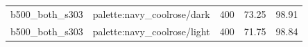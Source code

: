 \begin{longtable}{l>{\raggedright\arraybackslash}p{.42\linewidth}rrr}
b500\_\allowbreak{}both\_\allowbreak{}s303 & %
palette:navy\_\allowbreak{}coolrose/dark & %
400 & %
73.25 & %
98.91 \\ %

b500\_\allowbreak{}both\_\allowbreak{}s303 & %
palette:navy\_\allowbreak{}coolrose/light & %
400 & %
71.75 & %
98.84 \\ %


\end{longtable}
